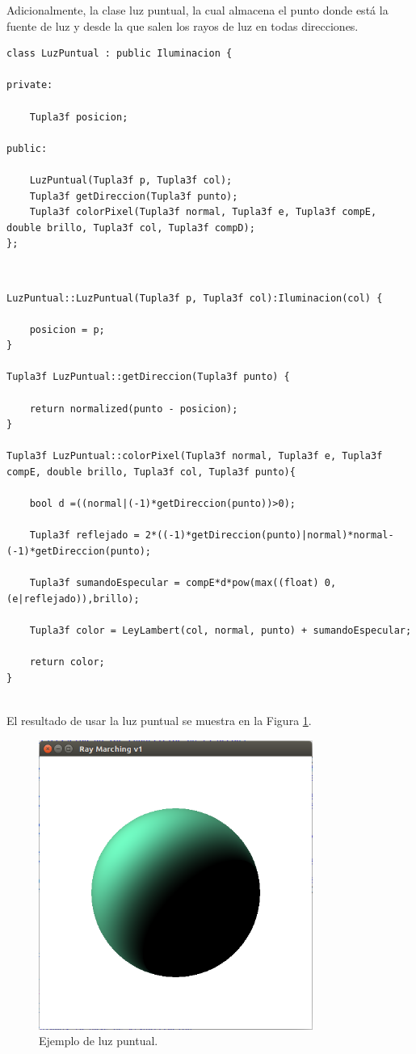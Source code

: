 Adicionalmente, la clase luz puntual, la cual almacena el punto donde está la fuente de luz y desde la que salen los rayos de luz en todas direcciones.
${ }$\\

\begin{lstlisting}[style=Consola]
class LuzPuntual : public Iluminacion {

private:

	Tupla3f posicion;

public:

	LuzPuntual(Tupla3f p, Tupla3f col);
	Tupla3f getDireccion(Tupla3f punto);
	Tupla3f colorPixel(Tupla3f normal, Tupla3f e, Tupla3f compE, double brillo, Tupla3f col, Tupla3f compD);
};
\end{lstlisting}
${ }$\\

\begin{lstlisting}[style=Consola]
LuzPuntual::LuzPuntual(Tupla3f p, Tupla3f col):Iluminacion(col) {

	posicion = p;
}

Tupla3f LuzPuntual::getDireccion(Tupla3f punto) {

	return normalized(punto - posicion);
}

Tupla3f LuzPuntual::colorPixel(Tupla3f normal, Tupla3f e, Tupla3f compE, double brillo, Tupla3f col, Tupla3f punto){

	bool d =((normal|(-1)*getDireccion(punto))>0);
	
	Tupla3f reflejado = 2*((-1)*getDireccion(punto)|normal)*normal-(-1)*getDireccion(punto);

	Tupla3f sumandoEspecular = compE*d*pow(max((float) 0, (e|reflejado)),brillo);

	Tupla3f color = LeyLambert(col, normal, punto) + sumandoEspecular;

	return color;
}
\end{lstlisting}
${ }$\\

El resultado de usar la luz puntual se muestra en la Figura \ref{fig:etiq_11}.
${ }$\\

\begin{figure}[h]
	\begin{center}
		\includegraphics[width=0.8\textwidth]{imagenes/puntual.png}
	\end{center}
	\caption{Ejemplo de luz puntual.}
	\label{fig:etiq_11}
\end{figure}

